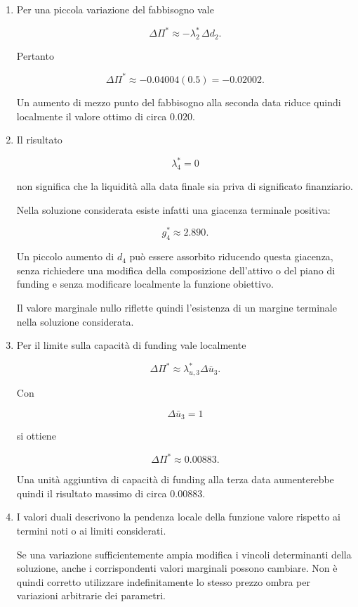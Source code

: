 \begin{enumerate}

\item Per una piccola variazione del fabbisogno vale

\[
\Delta\Pi^*
\approx
-\lambda_2^*\,\Delta d_2.
\]

Pertanto

\[
\Delta\Pi^*
\approx
-0.04004(0.5)
=
-0.02002.
\]

Un aumento di mezzo punto del fabbisogno alla seconda data riduce quindi
localmente il valore ottimo di circa $0.020$.

\item Il risultato

\[
\lambda_4^*=0
\]

non significa che la liquidit\`a alla data finale sia priva di significato
finanziario.

Nella soluzione considerata esiste infatti una giacenza terminale positiva:

\[
g_4^*\approx2.890.
\]

Un piccolo aumento di $d_4$ pu\`o essere assorbito riducendo questa giacenza,
senza richiedere una modifica della composizione dell'attivo o del piano di
funding e senza modificare localmente la funzione obiettivo.

Il valore marginale nullo riflette quindi l'esistenza di un margine terminale
nella soluzione considerata.

\item Per il limite sulla capacit\`a di funding vale localmente

\[
\Delta\Pi^*
\approx
\lambda_{u,3}^*
\Delta\bar u_3.
\]

Con

\[
\Delta\bar u_3=1
\]

si ottiene

\[
\Delta\Pi^*
\approx
0.00883.
\]

Una unit\`a aggiuntiva di capacit\`a di funding alla terza data aumenterebbe
quindi il risultato massimo di circa $0.00883$.

\item I valori duali descrivono la pendenza locale della funzione valore
rispetto ai termini noti o ai limiti considerati.

Se una variazione sufficientemente ampia modifica i vincoli determinanti
della soluzione, anche i corrispondenti valori marginali possono cambiare.
Non \`e quindi corretto utilizzare indefinitamente lo stesso prezzo ombra
per variazioni arbitrarie dei parametri.

\end{enumerate}

